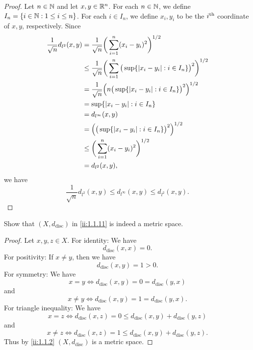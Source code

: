 \begin{proof}
  Let \(n \in \mathbb{N}\) and let \(x, y \in \mathbb{R}^n\).
  For each \(n \in \mathbb{N}\), we define \(I_n = \left\lbrace i \in \mathbb{N} : 1 \leq i \leq n\right\rbrace\).
  For each \(i \in I_n\), we define \(x_i, y_i\) to be the \(i^{\operatorname{th}}\) coordinate of \(x, y\), respectively.
  Since
  \begin{align*}
    \dfrac{1}{\sqrt{n}} d_{l^2}(x, y) & = \dfrac{1}{\sqrt{n}} \bigg(\sum_{i = 1}^n (x_i - y_i)^2\bigg)^{1 / 2}                                         \\
                                      & \leq \dfrac{1}{\sqrt{n}} \bigg(\sum_{i = 1}^n \big(\sup \set{\abs{x_i - y_i} : i \in I_n}\big)^2\bigg)^{1 / 2} \\
                                      & = \dfrac{1}{\sqrt{n}} \Big(n \big(\sup \set{\abs{x_i - y_i} : i \in I_n}\big)^2\Big)^{1 / 2}                   \\
                                      & = \sup \set{\abs{x_i - y_i} : i \in I_n}                                                                       \\
                                      & = d_{l^\infty}(x, y)                                                                                           \\
                                      & = \Big(\big(\sup \set{\abs{x_i - y_i} : i \in I_n}\big)^2\Big)^{1 / 2}                                         \\
                                      & \leq \bigg(\sum_{i = 1}^n (x_i - y_i)^2\bigg)^{1 / 2}                                                          \\
                                      & = d_{l^2}(x, y),
  \end{align*}
  we have
  \[
    \dfrac{1}{\sqrt{n}} d_{l^2}(x, y) \leq d_{l^\infty}(x, y) \leq d_{l^2}(x, y).
  \]
\end{proof}

\begin{ex}\label{ii:ex:1.1.11}
  Show that \((X, d_{\text{disc}})\) in \cref{ii:1.1.11} is indeed a metric space.
\end{ex}

\begin{proof}
  Let \(x, y, z \in X\).
  For identity:
  We have
  \[
    d_{\text{disc}}(x, x) = 0.
  \]
  For positivity:
  If \(x \neq y\), then we have
  \[
    d_{\text{disc}}(x, y) = 1 > 0.
  \]
  For symmetry:
  We have
  \[
    x = y \iff d_{\text{disc}}(x, y) = 0 = d_{\text{disc}}(y, x)
  \]
  and
  \[
    x \neq y \iff d_{\text{disc}}(x, y) = 1 = d_{\text{disc}}(y, x).
  \]
  For triangle inequality:
  We have
  \[
    x = z \iff d_{\text{disc}}(x, z) = 0 \leq d_{\text{disc}}(x, y) + d_{\text{disc}}(y, z)
  \]
  and
  \[
    x \neq z \iff d_{\text{disc}}(x, z) = 1 \leq d_{\text{disc}}(x, y) + d_{\text{disc}}(y, z).
  \]
  Thus by \cref{ii:1.1.2} \((X, d_{\text{disc}})\) is a metric space.
\end{proof}

